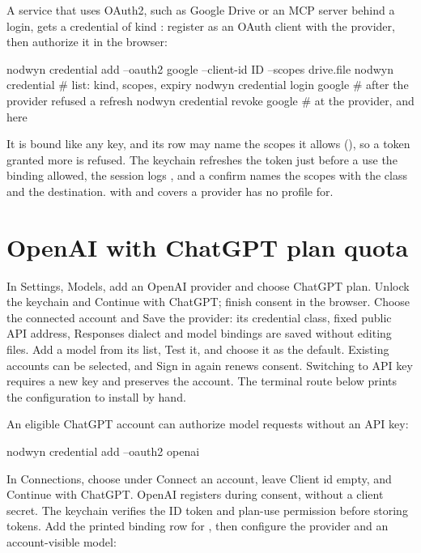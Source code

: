 A service that uses OAuth2, such as Google Drive or an MCP server behind a
login, gets a credential of kind : register \nodwyn{} as an
OAuth client with the provider, then authorize it in the browser:

\begin{sh}
nodwyn credential add --oauth2 google --client-id ID --scopes drive.file
nodwyn credential                     # list: kind, scopes, expiry
nodwyn credential login google        # after the provider refused a refresh
nodwyn credential revoke google       # at the provider, and here
\end{sh}

It is bound like any key, and its row may name the scopes it allows
(), so a token granted more is refused. The keychain
refreshes the token just before a use the binding allowed, the session logs
, and a confirm names the scopes with the class and the
destination.  with  and
 covers a provider \nodwyn{} has no profile for.

\section{OpenAI with ChatGPT plan quota}

In Settings, Models, add an OpenAI provider and choose ChatGPT plan.
Unlock the keychain and Continue with ChatGPT; finish consent in the browser.
Choose the connected account and Save the provider: its credential class,
fixed public API address, Responses dialect and model bindings are saved
without editing files. Add a model from its list, Test it, and choose it as
the default. Existing accounts can be selected, and Sign in again renews
consent. Switching to API key requires a new key and preserves the account.
The terminal route below prints the configuration to install by hand.


An eligible ChatGPT account can authorize model requests without an API key:

\begin{sh}
nodwyn credential add --oauth2 openai
\end{sh}

In Connections, choose  under Connect an account, leave Client
id empty, and Continue with ChatGPT. OpenAI registers \nodwyn{} during
consent, without a client secret. The keychain verifies the ID token and
plan-use permission before storing tokens. Add the printed binding row for
, then configure the provider and an account-visible model:

